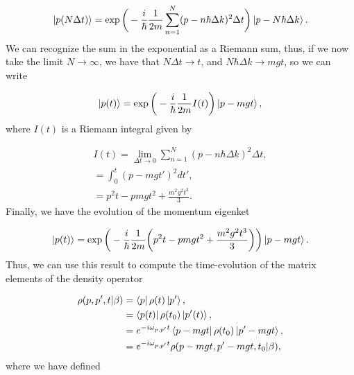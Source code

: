 \documentclass{article}
\begin{document}
\begin{equation}
    \ket{p(N \Delta t)} = \exp \bigg(-\frac{i}{\hbar} \frac{1}{2m} \sum_{n=1}^{N} (p- n\hbar \Delta k)^{2} \Delta t \bigg) \ket{p-N\hbar \Delta k}.
\end{equation}
%
We can recognize the sum in the exponential as a Riemann sum, thus, if we now take the limit $N \longrightarrow \infty$, we have that $N \Delta t \longrightarrow t$, and $N\hbar \Delta k \longrightarrow mgt$, so we can write

\begin{equation}
    \ket{p(t)} = \exp \bigg(- \frac{i}{\hbar} \frac{1}{2m} I(t) \bigg) \ket{p-mgt},
\end{equation}
%
where $I(t)$ is a Riemann integral given by

\begin{equation}
    \begin{split}
        I(t) = \lim_{\Delta t \to 0} \sum_{n=1}^{N} (p- n\hbar \Delta k)^{2} \Delta t, \\ = \int_{0}^{t}(p-mgt')^{2}dt', \\ = p^{2}t - pmgt^{2} + \frac{m^{2} g^{2} t^{3}}{3}.
    \end{split}
\end{equation}
%
Finally, we have the evolution of the momentum eigenket

\begin{equation}
    \ket{p(t)} = \exp \bigg( -\frac{i}{\hbar} \frac{1}{2m} \bigg(p^{2}t - pmgt^{2} + \frac{m^{2} g^{2} t^{3}}{3}\bigg) \bigg) \ket{p -mgt}.
\end{equation}
%
Thus, we can use this result to compute the time-evolution of the matrix elements of the density operator

\begin{equation}\label{time_evo_density_op_free_fall_H}
    \begin{aligned}
        \rho(p,p',t|\beta) & = \bra{p} \rho (t) \ket{p'}, \\ & = \bra{p(t)} \rho (t_{0}) \ket{p'(t)}, \\ & = e^{-i\omega_{p,p'} t} \bra{p-mgt} \rho(t_{0}) \ket{p'-mgt}, \\ & = e^{-i\omega_{p,p'} t} \rho (p-mgt, p'-mgt,t_{0}|\beta),
    \end{aligned}
\end{equation}
%
where we have defined
\end{document}
